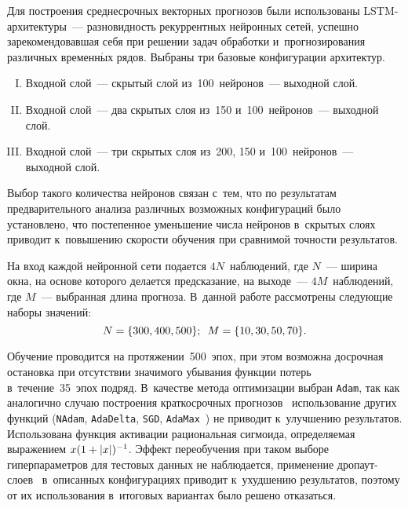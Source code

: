 \begin{multicols}{2}
Для построения среднесрочных векторных прогнозов были использованы 
LSTM-ар\-хи\-тек\-ту\-ры~--- 
разновидность рекуррентных нейронных сетей, успешно зарекомендовавшая себя 
при решении задач обработки и~прогнозирования различных временн$\acute{\mbox{ы}}$х рядов. 
Выбраны три базовые конфигурации архитектур.\\[-6pt]
\begin{enumerate} [I.]%
\item  Входной слой~--- скрытый слой из~100~нейронов~--- выходной слой.\\[-6pt]
\item  Входной слой~--- два скрытых слоя из~150 и~100~нейронов~--- выходной слой.\\[-6pt]
\item  Входной слой~--- три скрытых слоя из~200, 150 
и~100~нейронов~--- выходной слой.\\[-6pt]
\end{enumerate}

Выбор такого количества нейронов связан с~тем, что 
по результатам предварительного анализа различных возможных 
конфигураций было установлено, что постепенное уменьшение числа 
нейронов в~скрытых слоях приводит к~повышению скорости обучения 
при сравнимой точности ре\-зуль\-татов.
{ %

}

На вход каждой нейронной сети подается $4N$~наблюдений, где $N$~--- 
ширина окна, на основе которого делается предсказание, на выходе~--- 
$4M$~наблюдений, где $M$~--- выбранная длина прогноза. 
В~данной работе рассмотрены следующие наборы значений: 
$$
N = \{300, 400, 500\};\enskip M = \{10, 30, 50, 70\}.
$$

Обучение проводится на протяжении~500~эпох, 
при этом возможна досрочная остановка при отсутствии значимого убывания 
функции потерь в~течение~35~эпох подряд. 
В~качестве метода оптимизации выбран \verb"Adam", так как аналогично 
случаю построения краткосрочных прогнозов~\cite{Gorshenin2019c,Gorshenin2020} 
использование других функций (\verb"NAdam", \verb"AdaDelta", \verb"SGD", 
\verb"AdaMax"~\cite{Buduma2017}) не приводит к~улучшению результатов. 
Использована функция активации рациональная сигмоида, определяемая 
выражением $x(1\hm + |x|)^{-1}$. Эффект переобучения при 
таком выборе гиперпараметров для тестовых данных не наблюдается, 
применение дроп\-аут-слоев~\cite{Srivastava2014} в~описанных 
конфигурациях приводит к~ухудшению результатов, поэтому от их 
использования в~итоговых вариантах было решено отказаться.



\end{multicols}
